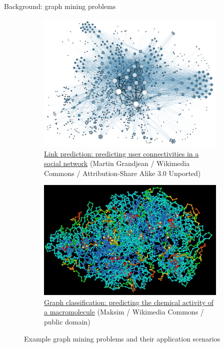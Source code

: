 \documentclass{beamer}
\begin{document}
\begin{frame}{Background: graph mining problems}
	\begin{figure}[H]
		\centering
		\begin{subfigure}{0.49\textwidth}
			\includegraphics[width=\linewidth]{Social_Network_Analysis_Visualization}
			\caption{
				\href{https://commons.wikimedia.org/wiki/File:Social_Network_Analysis_Visualization.png}{Link prediction: predicting user connectivities in a social network} (Martin Grandjean / Wikimedia Commons / Attribution-Share Alike 3.0 Unported)
			}
			\label{fig:Social_Network_Analysis_Visualization}
		\end{subfigure}
		\begin{subfigure}{0.49\textwidth}
			\includegraphics[width=\textwidth]{ProteinStructure}
			\caption{
				\href{https://commons.wikimedia.org/wiki/File:ProteinStructure.jpg}
				{Graph classification: predicting the chemical activity of a macromolecule} (Maksim / Wikimedia Commons / public domain)
			}
			\label{fig:protein}
		\end{subfigure}
		\caption{
			Example graph mining problems and their application scenarios
		}
		\label{fig:trainnig}
	\end{figure}
\end{frame}
\end{document}
